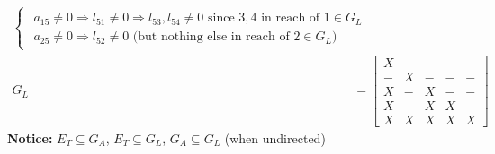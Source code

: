 \documentclass{article}
\begin{document}
\begin{align*}
\begin{cases}
        \begin{matrix}
            a_{15}\neq 0 \Rightarrow l_{51} \neq 0 \Longrightarrow l_{53}, l_{54} \neq 0 \textrm{ since $3,4$ in reach of $1 \in G_L$}\\
            a_{25}\neq 0 \Rightarrow l_{52} \neq 0 \textrm{ (but nothing else in reach of $2 \in G_L$)}
        \end{matrix}
    \end{cases}\\
    G_L &= \begin{bmatrix} X & - & -&-&-\\ - & X & -&-&-\\X & - & X &-&- \\
        X&-&X&X&-\\X&X&X&X&X\end{bmatrix}
\end{align*}
\textbf{Notice: } $E_T \subseteq G_A$, $E_T \subseteq G_L$, $G_A \subseteq G_L$ (when undirected)
\end{document}
